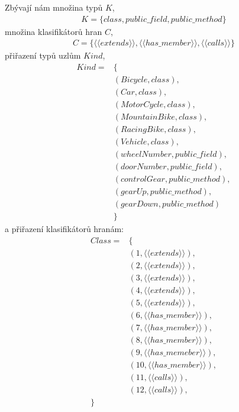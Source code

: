 Zbývají nám množina typů $K$,
\begin{align*}
K = \{ class, public\_field, public\_method \}
\end{align*}
množina klasifikátorů hran $C$,
\begin{align*}
C = \{ \langle\langle{}extends\rangle\rangle, \langle\langle{}has\_member\rangle\rangle, \langle\langle{}calls\rangle\rangle \}
\end{align*}
přiřazení typů uzlům $Kind$,
\begin{align*}
Kind = &\{ \\
&(Bicycle, class), \\
&(Car, class), \\
&(MotorCycle, class), \\
&(MountainBike, class), \\
&(RacingBike, class), \\
&(Vehicle, class), \\
&(wheelNumber, public\_field), \\
&(doorNumber, public\_field), \\
&(controlGear, public\_method), \\
&(gearUp, public\_method), \\
&(gearDown, public\_method) \\
&\}
\end{align*}
a přiřazení klasifikátorů hranám:
\begin{align*}
Class = &\{ \\
&(1, \langle\langle{}extends\rangle\rangle), \\
&(2, \langle\langle{}extends\rangle\rangle), \\
&(3, \langle\langle{}extends\rangle\rangle), \\
&(4, \langle\langle{}extends\rangle\rangle), \\
&(5, \langle\langle{}extends\rangle\rangle), \\
&(6, \langle\langle{}has\_member\rangle\rangle), \\
&(7, \langle\langle{}has\_member\rangle\rangle), \\
&(8, \langle\langle{}has\_member\rangle\rangle), \\
&(9, \langle\langle{}has\_memeber\rangle\rangle), \\
&(10, \langle\langle{}has\_member\rangle\rangle), \\
&(11, \langle\langle{}calls\rangle\rangle), \\
&(12, \langle\langle{}calls\rangle\rangle), \\
\}
\end{align*}


